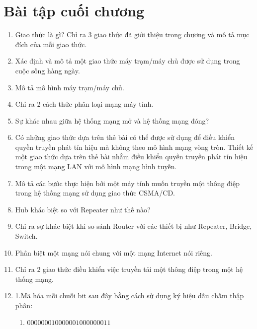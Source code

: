 \newpage
\section{Bài tập cuối chương}
\begin{multicols}{2}
  \begin{enumerate}

  \item Giao thức là gì? Chỉ ra 3 giao thức đã giới thiệu trong chương và mô tả mục đích
    của mỗi giao thức.

  \item Xác định và mô tả một giao thức máy trạm/máy chủ được sử dụng trong cuộc sống hàng ngày.

  \item Mô tả mô hình máy trạm/máy chủ.

  \item Chỉ ra 2 cách thức phân loại mạng máy tính.

  \item Sự khác nhau giữa hệ thống mạng mở và hệ thống mạng đóng?

  \item Có những giao thức dựa trên thẻ bài có thể được sử dụng để điều khiển quyền truyền
    phát tín hiệu mà không theo mô hình mạng vòng tròn. Thiết kế một giao thức dựa trên
    thẻ bài nhằm điều khiển quyền truyền phát tín hiệu trong một mạng LAN với mô hình mạng
    hình tuyến.

  \item Mô tả các bước thực hiện bởi một máy tính muốn truyền một thông điệp trong hệ
    thống mạng sử dụng giao thức CSMA/CD.

  \item Hub khác biệt so với Repeater như thế nào?

  \item Chỉ ra sự khác biệt khi so sánh Router với các thiết bị như Repeater, Bridge, Switch.

  \item Phân biệt một mạng nói chung với một mạng Internet nói riêng.

  \item Chỉ ra 2 giao thức điều khiển việc truyền tải một thông điệp trong một hệ thống mạng.

  \item 1.Mã hóa mỗi chuỗi bit sau đây bằng cách sử dụng ký hiệu dấu chấm thập phân:
    \begin{enumerate}
    \item $000000010000001000000011$


\end{enumerate}
\end{enumerate}
\end{multicols}
